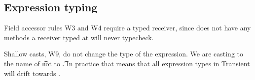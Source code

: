 \documentclass[a4paper,USenglish]{tex/lipics-v2016}
\begin{document}
\begin{mathpar}
\end{mathpar}

\begin{mathpar}

\end{mathpar}

\subsection{Expression typing}

Field accessor rules W3 and W4 require a typed receiver, since \any does
not have any methods a receiver typed at \any will never typecheck.

Shallow casts, W9, do not change the type of the expression. We are casting
to the name of \t not to \t.  In practice that means that all expression
types in Transient will drift towards \any.

~\\
\end{document}
